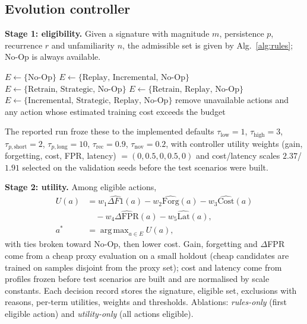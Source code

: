 \documentclass[conference]{IEEEtran}
\DeclareMathOperator*{\argmax}{arg\,max}
\begin{document}
\subsection{Evolution controller}
\label{sec:controller}
\textbf{Stage 1: eligibility.} Given a signature with magnitude $m$, persistence $p$, recurrence $r$ and unfamiliarity $n$, the admissible set is given by Alg.~\ref{alg:rules}; No-Op is always available.
\begin{algorithm}[t]
\caption{Eligibility rules (thresholds $\tau$ are parameters)}
\label{alg:rules}
\begin{algorithmic}[1]
 \State $E\gets\{\text{No-Op}\}$
 \State $E\gets\{\text{Replay, Incremental, No-Op}\}$
 \State $E\gets\{\text{Retrain, Strategic, No-Op}\}$
 \State $E\gets\{\text{Retrain, Replay, No-Op}\}$
\Else \State $E\gets\{\text{Incremental, Strategic, Replay, No-Op}\}$
\EndIf
\State remove unavailable actions and any action whose estimated training cost exceeds the budget
\end{algorithmic}
\end{algorithm}
The reported run froze these to the implemented defaults $\tau_{\text{low}}{=}1$, $\tau_{\text{high}}{=}3$, $\tau_{p,\text{short}}{=}2$, $\tau_{p,\text{long}}{=}10$, $\tau_{\text{rec}}{=}0.9$, $\tau_{\text{nov}}{=}0.2$, with controller utility weights (gain, forgetting, cost, FPR, latency) $=(0,0.5,0,0.5,0)$ and cost/latency scales $2.37$/$1.91$ selected on the validation seeds before the test scenarios were built.

\textbf{Stage 2: utility.} Among eligible actions,
\begin{align}
U(a)&=w_1\widehat{\Delta F1}(a)-w_2\widehat{\text{Forg}}(a)-w_3\widehat{\text{Cost}}(a)\nonumber\\
&\quad-w_4\widehat{\Delta\text{FPR}}(a)-w_5\widehat{\text{Lat}}(a),\\
a^{*}&=\argmax_{a\in E}U(a),
\end{align}
with ties broken toward No-Op, then lower cost. Gain, forgetting and $\Delta$FPR come from a cheap proxy evaluation on a small holdout (cheap candidates are trained on samples disjoint from the proxy set); cost and latency come from profiles frozen before test scenarios are built and are normalised by scale constants. Each decision record stores the signature, eligible set, exclusions with reasons, per-term utilities, weights and thresholds. Ablations: \emph{rules-only} (first eligible action) and \emph{utility-only} (all actions eligible).
\end{document}
